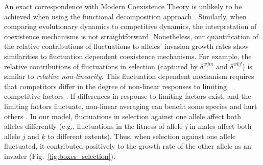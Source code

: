 \documentclass[12pt]{article}
\begin{document}
 An exact correspondence with Modern Coexistence Theory is unlikely to be achieved when using the functional decomposition approach \citep{ellner2016quantify,shoemaker2020}. Similarly, when comparing evolutionary dynamics to competitive dynamics, the interpretation of coexistence mechanisms is not straightforward. Nonetheless, our quantification of the relative contributions of fluctuations to alleles' invasion growth rates show similarities to fluctuation dependent coexistence mechanisms. For example, the relative contributions of fluctuations in selection (captured by $\delta^{wjm}$ and $\delta^{wkf}$) is similar to \textit{relative non-linearity}. This fluctuation dependent mechanism requires that competitors differ in the degree of non-linear responses to limiting competitive factors \citep{Chesson2000,zepeda2019fluctuation}. If differences in response to limiting factors exist, and the limiting factors fluctuate, non-linear averaging can benefit some species and hurt others \citep{ellner_expanded_2019}. In our model, fluctuations in selection against one allele affect both alleles differently (e.g., fluctuations in the fitness of allele \textit{j} in males affect both allele $j$ and $k$ to different extents). Thus, when selection against one allele fluctuated, it contributed positively to the growth rate of the other allele as an invader (Fig.~\ref{fig:boxes_selection}).



\end{document}
